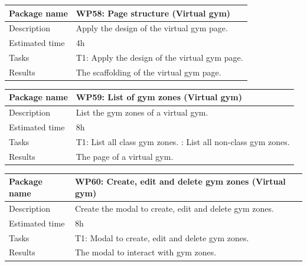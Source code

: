 \documentclass[a4paper, 12pt, oneside]{book}
\begin{document}
\vspace*{16pt}
\begin{tabularx}{\textwidth}{| l | X |}
	\hline
	\rowcolor{rowColor}
	{\semibf Package name}   & {\semibf WP58}: Page structure (Virtual gym)            \\
	\hline
	{\semibf Description}    & Apply the design of the virtual gym page.               \\
	\hline
	\rowcolor{rowColor}
	{\semibf Estimated time} & 4h                                                      \\
	\hline
	{\semibf Tasks}          & {\semibf T1}: Apply the design of the virtual gym page. \\
	\hline
	\rowcolor{rowColor}
	{\semibf Results}        & The scaffolding of the virtual gym page.                \\
	\hline
\end{tabularx}
\vspace*{16pt}
\begin{tabularx}{\textwidth}{| l | X |}
	\hline
	\rowcolor{rowColor}
	{\semibf Package name}   & {\semibf WP59}: List of gym zones (Virtual gym) \\
	\hline
	{\semibf Description}    & List the gym zones of a virtual gym.            \\
	\hline
	\rowcolor{rowColor}
	{\semibf Estimated time} & 8h                                              \\
	\hline
	{\semibf Tasks}          & {\semibf T1}: List all class gym zones.
	\newline {\semibf T2}: List all non-class gym zones.                       \\
	\hline
	\rowcolor{rowColor}
	{\semibf Results}        & The page of a virtual gym.                      \\
	\hline
\end{tabularx}
\vspace*{16pt}
\begin{tabularx}{\textwidth}{| l | X |}
	\hline
	\rowcolor{rowColor}
	{\semibf Package name}   & {\semibf WP60}: Create, edit and delete gym zones (Virtual gym) \\
	\hline
	{\semibf Description}    & Create the modal to create, edit and delete gym zones.          \\
	\hline
	\rowcolor{rowColor}
	{\semibf Estimated time} & 8h                                                              \\
	\hline
	{\semibf Tasks}          & {\semibf T1}: Modal to create, edit and delete gym zones.       \\
	\hline
	\rowcolor{rowColor}
	{\semibf Results}        & The modal to interact with gym zones.                           \\
	\hline
\end{tabularx}
\end{document}
